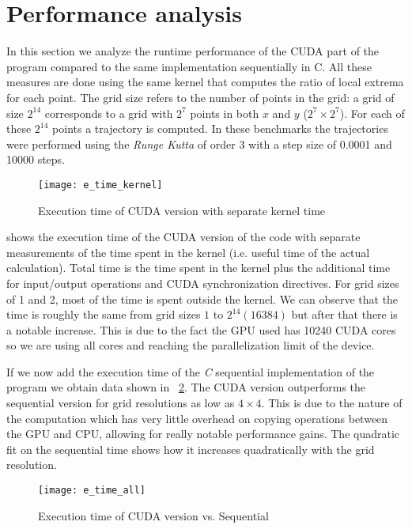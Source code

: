 
\section{Performance analysis}


In this section we analyze the runtime performance of the CUDA part of
the program compared to the same implementation sequentially in C. All
these measures are done using the same kernel that computes the ratio
of local extrema for each point. The grid size refers to the number of
points in the grid: a grid of size $2^14$ corresponds to a
grid with $2^7$ points in both $x$ and $y$ ($2^7 \times 2^7$). For each of these
$2^14$ points a trajectory is computed. In these benchmarks the trajectories were
performed using the \emph{Runge Kutta} of order 3 with a step size of 0.0001 and
10000 steps.


\begin{figure}[H]
    \centering
    \texttt{[image: e\_time\_kernel]}
    \caption{Execution time of CUDA version with separate kernel time
    }%
    \label{fig:time_overhead}
\end{figure}

 shows the execution time of the CUDA version of the code with separate measurements of the time spent in the kernel (i.e. useful time of the actual calculation). Total time is the time spent in the kernel plus the additional time for input/output operations and CUDA synchronization directives. For grid sizes of 1 and 2, most of the time is spent outside the kernel. We can observe that the time is roughly the same from grid sizes $1$ to $2^14 (16384)$ but after that there is a notable increase. This is due to the fact the GPU used has 10240 CUDA cores so
we are using all cores and reaching the parallelization limit of the device.

If we now add the execution time of the \emph{C} sequential implementation of the
program we obtain data shown in ~\cref{fig:time_cuda}. The CUDA version outperforms the sequential version for grid resolutions as low as $4\times4$. This is due to the nature of the computation which has very little overhead on copying operations between the GPU and CPU, allowing for really notable performance gains. The quadratic fit on the sequential time shows how it increases quadratically with the grid resolution.

\begin{figure}[H]
    \centering
    \texttt{[image: e\_time\_all]}
    \caption{Execution time of CUDA version vs. Sequential}%
    \label{fig:time_cuda}
\end{figure}

